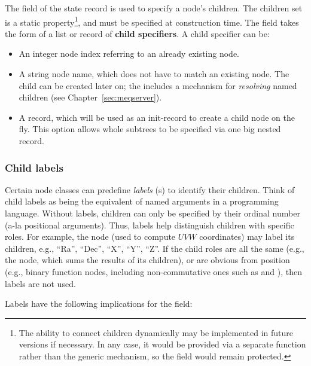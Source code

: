   The  field of the state record is used to specify a node's
  children. The children set is a static property\footnote{The ability to
  connect children dynamically may be implemented in future versions if
  necessary. In any case, it would be provided via a separate function rather
  than the generic  mechanism, so the  field would
  remain protected.}, and must be specified at construction time. The
   field takes the form of a list or record of {\bf child
  specifiers}. A child specifier can be:

  \begin{itemize}
  
  \item An integer node index referring to an already existing node.
  
  \item A string node name, which does not have to match an existing node. The
    child can be created later on; the  includes a mechanism 
    for {\em resolving} named children (see Chapter~\ref{sec:meqserver}).
    
  \item A record, which will be used as an init-record to create a child node on
    the fly. This option allows whole subtrees to be specified via one big
    nested record.
  
  \end{itemize}
  
  \subsubsection{Child labels}
  
  Certain node classes can predefine {\em labels} (s) to identify their
  children. Think of child labels as being the equivalent of named arguments in
  a programming language. Without labels, children can only be specified by
  their ordinal number (a-la positional arguments). Thus, labels help
  distinguish children with specific roles. For example, the  node
  (used to compute $UVW$ coordinates) may label its children, e.g., ``Ra'',
  ``Dec'', ``X'', ``Y'', ``Z''. If the child roles are all the same (e.g.,
  the  node, which sums the results of its children), or are obvious
  from position (e.g., binary function nodes, including non-commutative ones
  such as  and ), then labels are not used.
  
  Labels have the following implications for the  field:
  
